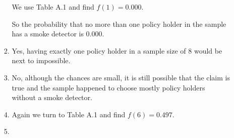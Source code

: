 \documentclass[12pt,letterpaper]{article}
\begin{document}
\begin{enumerate}
\begin{enumerate}
\begin{enumerate}[label=(\arabic*)]
              We use Table A.1 and find $f(1) = 0.000$.

              So the probability that no more than one policy holder in the sample has a smoke detector is 0.000.
            \item
              Yes, having exactly one policy holder in a sample size of 8 would be next to impossible.
            \item
              No, although the chances are small,
              it is still possible that the claim is true and
              the sample happened to choose mostly policy holders without a smoke detector.
            \item

              Again we turn to Table A.1 and find $f(6) = 0.497$.
            \item


\end{enumerate}
\end{enumerate}
\end{enumerate}
\end{document}
